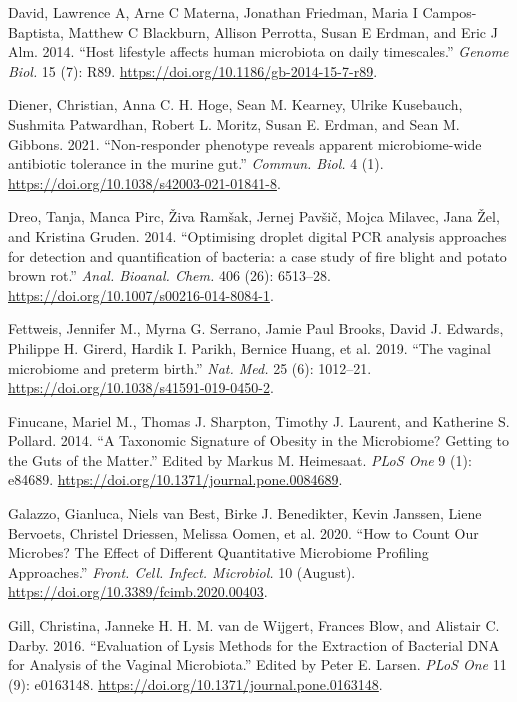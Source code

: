 \documentclass[
]{article}
\newlength{\cslhangindent}
\newlength{\cslentryspacingunit} %
\newenvironment{CSLReferences}[2] %
 {%
  \setlength{\parindent}{0pt}
  \ifodd #1
  \let\oldpar\par
  \def\par{\hangindent=\cslhangindent\oldpar}
  \fi
  \setlength{\parskip}{#2\cslentryspacingunit}
 }%
 {}
\begin{document}
\begin{CSLReferences}{1}{0}
\leavevmode{}%
David, Lawrence A, Arne C Materna, Jonathan Friedman, Maria I Campos-Baptista, Matthew C Blackburn, Allison Perrotta, Susan E Erdman, and Eric J Alm. 2014. {``{Host lifestyle affects human microbiota on daily timescales}.''} \emph{Genome Biol.} 15 (7): R89. \url{https://doi.org/10.1186/gb-2014-15-7-r89}.

\leavevmode{}%
Diener, Christian, Anna C. H. Hoge, Sean M. Kearney, Ulrike Kusebauch, Sushmita Patwardhan, Robert L. Moritz, Susan E. Erdman, and Sean M. Gibbons. 2021. {``{Non-responder phenotype reveals apparent microbiome-wide antibiotic tolerance in the murine gut}.''} \emph{Commun. Biol.} 4 (1). \url{https://doi.org/10.1038/s42003-021-01841-8}.

\leavevmode{}%
Dreo, Tanja, Manca Pirc, Živa Ramšak, Jernej Pavšič, Mojca Milavec, Jana Žel, and Kristina Gruden. 2014. {``{Optimising droplet digital PCR analysis approaches for detection and quantification of bacteria: a case study of fire blight and potato brown rot}.''} \emph{Anal. Bioanal. Chem.} 406 (26): 6513--28. \url{https://doi.org/10.1007/s00216-014-8084-1}.

\leavevmode{}%
Fettweis, Jennifer M., Myrna G. Serrano, Jamie Paul Brooks, David J. Edwards, Philippe H. Girerd, Hardik I. Parikh, Bernice Huang, et al. 2019. {``{The vaginal microbiome and preterm birth}.''} \emph{Nat. Med.} 25 (6): 1012--21. \url{https://doi.org/10.1038/s41591-019-0450-2}.

\leavevmode{}%
Finucane, Mariel M., Thomas J. Sharpton, Timothy J. Laurent, and Katherine S. Pollard. 2014. {``{A Taxonomic Signature of Obesity in the Microbiome? Getting to the Guts of the Matter}.''} Edited by Markus M. Heimesaat. \emph{PLoS One} 9 (1): e84689. \url{https://doi.org/10.1371/journal.pone.0084689}.

\leavevmode{}%
Galazzo, Gianluca, Niels van Best, Birke J. Benedikter, Kevin Janssen, Liene Bervoets, Christel Driessen, Melissa Oomen, et al. 2020. {``{How to Count Our Microbes? The Effect of Different Quantitative Microbiome Profiling Approaches}.''} \emph{Front. Cell. Infect. Microbiol.} 10 (August). \url{https://doi.org/10.3389/fcimb.2020.00403}.

\leavevmode{}%
Gill, Christina, Janneke H. H. M. van de Wijgert, Frances Blow, and Alistair C. Darby. 2016. {``{Evaluation of Lysis Methods for the Extraction of Bacterial DNA for Analysis of the Vaginal Microbiota}.''} Edited by Peter E. Larsen. \emph{PLoS One} 11 (9): e0163148. \url{https://doi.org/10.1371/journal.pone.0163148}.


\end{CSLReferences}
\end{document}
